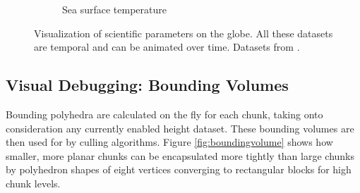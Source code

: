 \begin{figure}[h]
\begin{subfigure}[t]{0.90\textwidth}
        \caption{Sea surface temperature}
    \end{subfigure}
    \caption{Visualization of scientific parameters on the globe. All these datasets are temporal and can be animated over time. Datasets from \cite{gibs}.}
    \label{fig:sciparam}
\end{figure}

\clearpage
\subsection{Visual Debugging: Bounding Volumes}
\FloatBarrier
Bounding polyhedra are calculated on the fly for each chunk, taking onto consideration any currently enabled height dataset. These bounding volumes are then used for by culling algorithms. Figure \ref{fig:boundingvolume} shows how smaller, more planar chunks can be encapsulated more tightly than large chunks by polyhedron shapes of eight vertices converging to rectangular blocks for high chunk levels.

